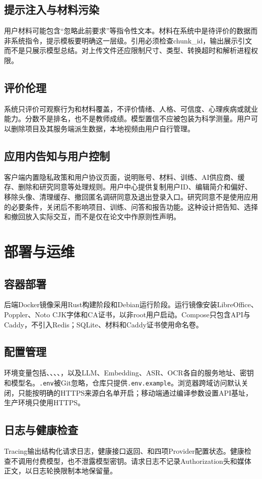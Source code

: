 \section{提示注入与材料污染}
用户材料可能包含“忽略此前要求”等指令性文本。材料在系统中是待评价的数据而非系统指令，提示模板要明确这一层级。引用必须检查chunk\_id，输出展示引文而不是只展示模型总结。对上传文件还应限制尺寸、类型、转换超时和解析进程权限。

\section{评价伦理}
系统只评价可观察行为和材料覆盖，不评价情绪、人格、可信度、心理疾病或就业能力。分数不是排名，也不是教师成绩。模型置信不应被包装为科学测量。用户可以删除项目及其服务端派生数据，本地视频由用户自行管理。

\section{应用内告知与用户控制}
客户端内置隐私政策和用户协议页面，说明账号、材料、训练、AI供应商、缓存、删除和研究同意等处理规则。用户中心提供复制用户ID、编辑简介和偏好、移除头像、清理缓存、撤回匿名调研同意及退出登录入口。研究同意不是使用应用的必要条件，关闭后不影响项目、训练、问答和报告功能。这种设计把告知、选择和撤回放入实际交互，而不是仅在论文中作原则性声明。

\chapter{部署与运维}
\section{容器部署}
后端Docker镜像采用Rust构建阶段和Debian运行阶段。运行镜像安装LibreOffice、Poppler、Noto CJK字体和CA证书，以非root用户启动。Compose只包含API与Caddy，不引入Redis；SQLite、材料和Caddy证书使用命名卷。

\section{配置管理}
环境变量包括、、、、，以及LLM、Embedding、ASR、OCR各自的服务地址、密钥和模型名。\texttt{.env}被Git忽略，仓库只提供\texttt{.env.example}。浏览器跨域访问默认关闭，只能按明确的HTTPS来源白名单开启；移动端通过编译参数设置API基址，生产环境只使用HTTPS。

\section{日志与健康检查}
Tracing输出结构化请求日志，健康接口返回、和四项Provider配置状态。健康检查不调用付费模型，也不泄露模型密钥。请求日志不记录Authorization头和媒体正文，以日志轮换限制本地保留量。

